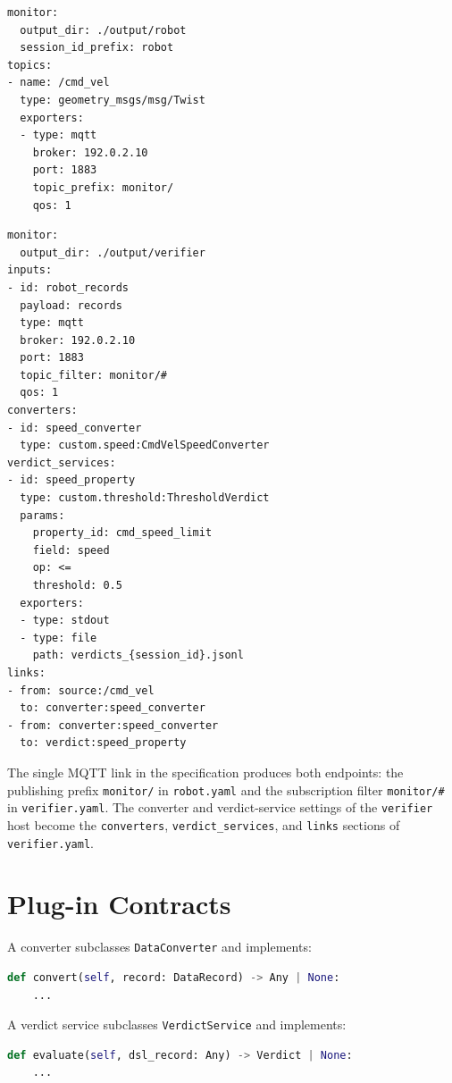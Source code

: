 \begin{lstlisting}[language={},caption={Generated \texttt{robot.yaml},
started with \texttt{monitor\_node}.},label={lst:gen-robot}]
monitor:
  output_dir: ./output/robot
  session_id_prefix: robot
topics:
- name: /cmd_vel
  type: geometry_msgs/msg/Twist
  exporters:
  - type: mqtt
    broker: 192.0.2.10
    port: 1883
    topic_prefix: monitor/
    qos: 1
\end{lstlisting}

\begin{lstlisting}[language={},caption={Generated \texttt{verifier.yaml},
started with \texttt{node\_runner}.},label={lst:gen-verifier}]
monitor:
  output_dir: ./output/verifier
inputs:
- id: robot_records
  payload: records
  type: mqtt
  broker: 192.0.2.10
  port: 1883
  topic_filter: monitor/#
  qos: 1
converters:
- id: speed_converter
  type: custom.speed:CmdVelSpeedConverter
verdict_services:
- id: speed_property
  type: custom.threshold:ThresholdVerdict
  params:
    property_id: cmd_speed_limit
    field: speed
    op: <=
    threshold: 0.5
  exporters:
  - type: stdout
  - type: file
    path: verdicts_{session_id}.jsonl
links:
- from: source:/cmd_vel
  to: converter:speed_converter
- from: converter:speed_converter
  to: verdict:speed_property
\end{lstlisting}

The single MQTT link in the specification produces both endpoints: the
publishing prefix \texttt{monitor/} in \texttt{robot.yaml} and the
subscription filter \texttt{monitor/\#} in \texttt{verifier.yaml}. The
converter and verdict-service settings of the \texttt{verifier} host become
the \texttt{converters}, \texttt{verdict\_services}, and \texttt{links}
sections of \texttt{verifier.yaml}.

\section{Plug-in Contracts}\label{app:plugin-contracts}

A converter subclasses \texttt{DataConverter} and implements:

\begin{lstlisting}[language=Python]
def convert(self, record: DataRecord) -> Any | None:
    ...
\end{lstlisting}

A verdict service subclasses \texttt{VerdictService} and implements:

\begin{lstlisting}[language=Python]
def evaluate(self, dsl_record: Any) -> Verdict | None:
    ...
\end{lstlisting}

